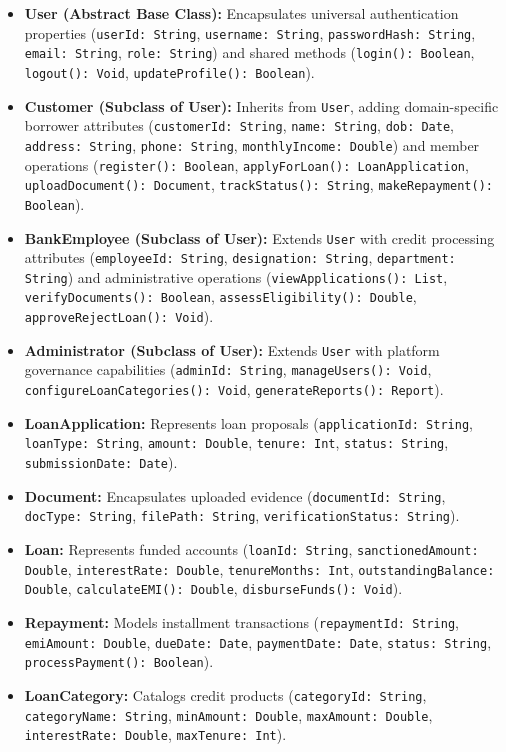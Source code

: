 \begin{itemize}
  \item \textbf{User (Abstract Base Class):} Encapsulates universal authentication properties (\texttt{userId: String}, \texttt{username: String}, \texttt{passwordHash: String}, \texttt{email: String}, \texttt{role: String}) and shared methods (\texttt{login(): Boolean}, \texttt{logout(): Void}, \texttt{updateProfile(): Boolean}).
  \item \textbf{Customer (Subclass of User):} Inherits from \texttt{User}, adding domain-specific borrower attributes (\texttt{customerId: String}, \texttt{name: String}, \texttt{dob: Date}, \texttt{address: String}, \texttt{phone: String}, \texttt{monthlyIncome: Double}) and member operations (\texttt{register(): Boolean}, \texttt{applyForLoan(): LoanApplication}, \texttt{uploadDocument(): Document}, \texttt{trackStatus(): String}, \texttt{makeRepayment(): Boolean}).
  \item \textbf{BankEmployee (Subclass of User):} Extends \texttt{User} with credit processing attributes (\texttt{employeeId: String}, \texttt{designation: String}, \texttt{department: String}) and administrative operations (\texttt{viewApplications(): List}, \texttt{verifyDocuments(): Boolean}, \texttt{assessEligibility(): Double}, \texttt{approveRejectLoan(): Void}).
  \item \textbf{Administrator (Subclass of User):} Extends \texttt{User} with platform governance capabilities (\texttt{adminId: String}, \texttt{manageUsers(): Void}, \texttt{configureLoanCategories(): Void}, \texttt{generateReports(): Report}).
  \item \textbf{LoanApplication:} Represents loan proposals (\texttt{applicationId: String}, \texttt{loanType: String}, \texttt{amount: Double}, \texttt{tenure: Int}, \texttt{status: String}, \texttt{submissionDate: Date}).
  \item \textbf{Document:} Encapsulates uploaded evidence (\texttt{documentId: String}, \texttt{docType: String}, \texttt{filePath: String}, \texttt{verificationStatus: String}).
  \item \textbf{Loan:} Represents funded accounts (\texttt{loanId: String}, \texttt{sanctionedAmount: Double}, \texttt{interestRate: Double}, \texttt{tenureMonths: Int}, \texttt{outstandingBalance: Double}, \texttt{calculateEMI(): Double}, \texttt{disburseFunds(): Void}).
  \item \textbf{Repayment:} Models installment transactions (\texttt{repaymentId: String}, \texttt{emiAmount: Double}, \texttt{dueDate: Date}, \texttt{paymentDate: Date}, \texttt{status: String}, \texttt{processPayment(): Boolean}).
  \item \textbf{LoanCategory:} Catalogs credit products (\texttt{categoryId: String}, \texttt{categoryName: String}, \texttt{minAmount: Double}, \texttt{maxAmount: Double}, \texttt{interestRate: Double}, \texttt{maxTenure: Int}).
\end{itemize}

